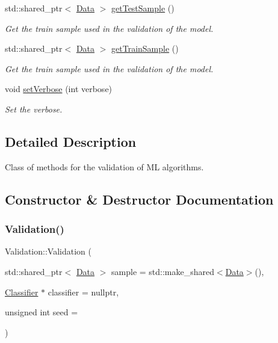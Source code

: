 \begin{DoxyCompactItemize}
std\+::shared\+\_\+ptr$<$ \hyperlink{class_data}{Data} $>$ \hyperlink{class_validation_a704c7a3da9a17f2a4fd28e02640256be}{get\+Test\+Sample} ()
\begin{DoxyCompactList}\small\item\em Get the train sample used in the validation of the model. \end{DoxyCompactList}\item 
std\+::shared\+\_\+ptr$<$ \hyperlink{class_data}{Data} $>$ \hyperlink{class_validation_ae31ccc41bcfe7e3269cde8bed2ed4cc9}{get\+Train\+Sample} ()
\begin{DoxyCompactList}\small\item\em Get the train sample used in the validation of the model. \end{DoxyCompactList}\item 
void \hyperlink{class_validation_ac402fbabbd6148d7c2ac0c7c9a854177}{set\+Verbose} (int verbose)
\begin{DoxyCompactList}\small\item\em Set the verbose. \end{DoxyCompactList}\end{DoxyCompactItemize}


\subsection{Detailed Description}
Class of methods for the validation of ML algorithms. 

\subsection{Constructor \& Destructor Documentation}
\mbox{\label{class_validation_abc3509e1641aa9fadf3bcdf3df368b2f}} 
\subsubsection{\texorpdfstring{Validation()}{Validation()}}
{\footnotesize\ttfamily Validation\+::\+Validation (\begin{DoxyParamCaption}\item[{std\+::shared\+\_\+ptr$<$ \hyperlink{class_data}{Data} $>$}]{sample = {\ttfamily std\+:\+:make\+\_\+shared$<$\hyperlink{class_data}{Data}$>$()},  }\item[{\hyperlink{class_classifier}{Classifier} $\ast$}]{classifier = {\ttfamily nullptr},  }\item[{unsigned int}]{seed = {} }\end{DoxyParamCaption})\hspace{0.3cm}{\ttfamily [explicit]}}



